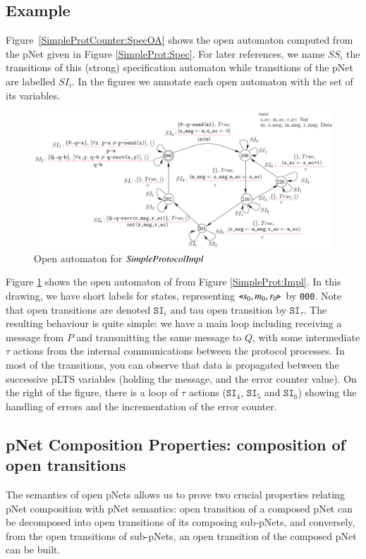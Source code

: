 \documentclass{elsarticle}
\begin{document}
\subsection*{Example}  Figure~\ref{SimpleProtCounter:SpecOA} shows the open automaton computed from the  pNet  given in Figure \ref{SimpleProt:Spec}. 
For later references, we name $SS_i$ the transitions of this (strong)
specification automaton while transitions of the
  pNet are labelled $SI_i$.
 In the figures we
annotate each open automaton with the set of its variables.


 \begin{figure}[ht]
  \centerline{\includegraphics[width=\linewidth]{XFIG/SPImplOpen}}
  \caption{Open automaton for $\symb{SimpleProtocolImpl}$}  \label{SimpleProtCounter:ImplOA}
\end{figure}


    Figure \ref{SimpleProtCounter:ImplOA} shows the open automaton of   from Figure \ref{SimpleProt:Impl}. In this drawing, we have short labels for states, representing $\triangleleft{s_0,m_0,r_0}\triangleright$ by \texttt{000}. Note that open transitions are denoted $\texttt{SI}_i$ and tau open transition by  $\texttt{SI}_{\tau}$. The resulting behaviour is quite simple:  we have a main loop including receiving a message from $P$ and transmitting the same message to $Q$, with some intermediate $\tau$ actions from the internal communications between the protocol processes. In most of the transitions, you can observe that data is propagated between the successive pLTS variables (holding the message, and the error counter value). On the right of the figure, there is a loop of $\tau$ actions ($\texttt{SI}_4$, $\texttt{SI}_5$ and $\texttt{SI}_6$)  showing the handling of errors and the incrementation of the error counter.
    
    
  

\subsection{pNet Composition Properties: composition of open transitions}
The semantics of open pNets allows us to prove two crucial properties relating pNet composition with pNet semantics: open transition of a composed pNet can be decomposed into open transitions of its composing sub-pNets, and conversely, from the open transitions of sub-pNets,  an open transition of the composed pNet can be built.
\end{document}
